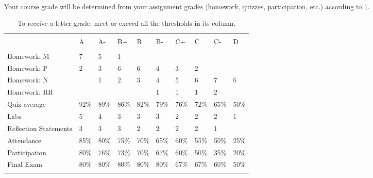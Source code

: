 \documentclass[symmetric]{tufte-handout}
\begin{document}
    Your course grade will be determined from your assignment grades
    (homework, quizzes, participation, etc.) according to \cref{table-grades}.

    \begin{fullwidth}
    \begin{table}\label{table-grades}
        \centering
        \begin{tabularx}{\linewidth}{lXXXXXXXXX}
        \toprule \\
                              & A    & A-   & B+   & B    & B-   & C+   & C    & C-   & D     \\
        \midrule \\
        Homework: M           & 7    & 5    & 1    &      &      &      &      &      &       \\
        Homework: P           & 2    & 3    & 6    & 6    & 4    & 3    & 2    &      &       \\
        Homework: N           &      & 1    & 2    & 3    & 4    & 5    & 6    & 7    & 6     \\
        Homework: RR          &      &      &      &      & 1    & 1    & 1    & 2    &       \\
        Quiz average          & 92\% & 89\% & 86\% & 82\% & 79\% & 76\% & 72\% & 65\% & 50\%  \\
        Labs                  & 5    & 4    & 3    & 3    & 3    & 2    & 2    & 2    & 1     \\
        Reflection Statements & 3    & 3    & 3    & 2    & 2    & 2    & 2    & 1    &       \\
        Attendance            & 85\% & 80\% & 75\% & 70\% & 65\% & 60\% & 55\% & 50\% & 25\%  \\
        Participation         & 80\% & 76\% & 73\% & 70\% & 67\% & 60\% & 50\% & 35\% & 20\%  \\
        Final Exam            & 80\% & 80\% & 80\% & 80\% & 80\% & 67\% & 67\% & 60\% & 50\%  \\
        \bottomrule \\
        \end{tabularx}
        \caption{To receive a letter grade, meet or exceed all the thresholds in its column.}
    \end{table}
    \end{fullwidth}
\end{document}
